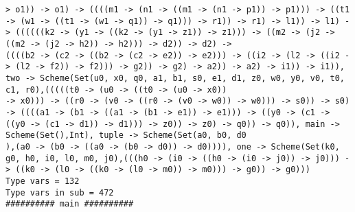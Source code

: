 \documentclass[11pt,oneside,a4paper]{report}
\begin{document}
\begin{lstlisting}[breaklines=true,caption={The output of an exponential type},label=lst:appedix:bigexp]
> o1)) -> o1) -> ((((m1 -> (n1 -> ((m1 -> (n1 -> p1)) -> p1))) -> ((t1 -> (w1 -> ((t1 -> (w1 -> q1)) -> q1))) -> r1)) -> r1) -> l1)) -> l1) -> ((((((k2 -> (y1 -> ((k2 -> (y1 -> z1)) -> z1))) -> ((m2 -> (j2 -> ((m2 -> (j2 -> h2)) -> h2))) -> d2)) -> d2) ->
((((b2 -> (c2 -> ((b2 -> (c2 -> e2)) -> e2))) -> ((i2 -> (l2 -> ((i2 -> (l2 -> f2)) -> f2))) -> g2)) -> g2) -> a2)) -> a2) -> i1)) -> i1)), two -> Scheme(Set(u0, x0, q0, a1, b1, s0, e1, d1, z0, w0, y0, v0, t0, c1, r0),(((((t0 -> (u0 -> ((t0 -> (u0 -> x0))
-> x0))) -> ((r0 -> (v0 -> ((r0 -> (v0 -> w0)) -> w0))) -> s0)) -> s0) -> ((((a1 -> (b1 -> ((a1 -> (b1 -> e1)) -> e1))) -> ((y0 -> (c1 -> ((y0 -> (c1 -> d1)) -> d1))) -> z0)) -> z0) -> q0)) -> q0)), main -> Scheme(Set(),Int), tuple -> Scheme(Set(a0, b0, d0
),(a0 -> (b0 -> ((a0 -> (b0 -> d0)) -> d0)))), one -> Scheme(Set(k0, g0, h0, i0, l0, m0, j0),(((h0 -> (i0 -> ((h0 -> (i0 -> j0)) -> j0))) -> ((k0 -> (l0 -> ((k0 -> (l0 -> m0)) -> m0))) -> g0)) -> g0)))
Type vars = 132
Type vars in sub = 472
########## main ##########
\end{lstlisting}
\end{document}
